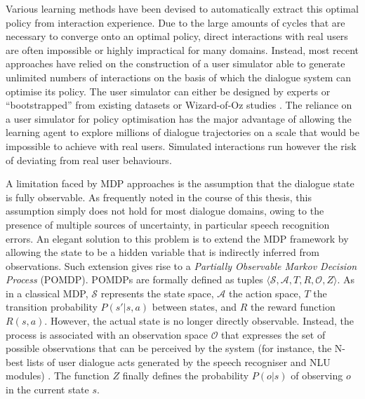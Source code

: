 Various learning methods have been devised to automatically extract this optimal policy from interaction experience. Due to the large amounts of cycles that are necessary to converge onto an optimal policy, direct interactions with real users are often impossible or highly impractical for many domains. Instead, most recent approaches have relied on the construction of a user simulator able to generate unlimited numbers of interactions on the basis of which the dialogue system can optimise its policy.  
The user simulator can either be designed by experts  or ``bootstrapped'' from existing datasets  or Wizard-of-Oz studies \citep{InTech_RL_2008_OP,FramptonL09}. The reliance on a user simulator for policy optimisation has the major advantage of allowing the learning agent to explore millions of dialogue trajectories on a scale that would be impossible to achieve with real users.  Simulated interactions run however the risk of deviating from real user behaviours.

A limitation faced by MDP approaches is the assumption that the dialogue state is fully observable. As frequently noted in the course of this thesis, this assumption simply does not hold for most dialogue domains, owing to the presence of multiple sources of uncertainty, in particular speech recognition errors.  An elegant solution to this problem is to extend the MDP framework by allowing the state to be a hidden variable that is indirectly inferred from observations.  Such extension gives rise to a  \textit{Partially Observable Markov Decision Process} (POMDP).  POMDPs are formally defined as tuples $\langle \mathcal{S}, \mathcal{A}, T, R, \mathcal{O}, Z \rangle$.  As in a classical MDP, $\mathcal{S}$ represents the state space, $\mathcal{A}$ the action space, $T$ the transition probability $P(s'|s,a)$ between states, and $R$ the reward function $R(s,a)$.  However, the actual state is no longer directly observable.  Instead, the process is associated with an observation space $\mathcal{O}$ that expresses the set of possible observations that can be perceived by the system (for instance, the N-best lists of user dialogue acts generated by the speech recogniser and NLU modules) . The function $Z$ finally defines the probability $P(o|s)$ of observing $o$ in the current state $s$.  

